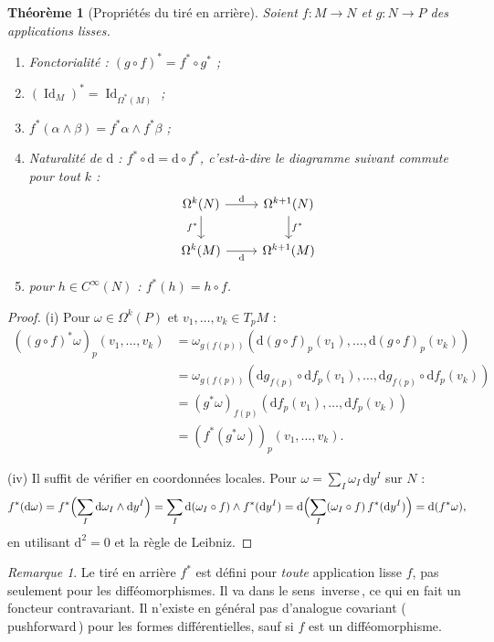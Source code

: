 \documentclass[12pt,a4paper,openany]{book}
\theoremstyle{definition}
\theoremstyle{plain}
\newtheorem{theoreme}[definition]{Théorème}
\theoremstyle{remark}
\newtheorem{remarque}[definition]{Remarque}
\DeclareMathOperator{\Id}{Id}
\newcommand{\dd}{\mathrm{d}}
\providecommand{\og}{\guillemotleft\,}
\providecommand{\fg}{\,\guillemotright}
\begin{document}
\begin{theoreme}[Propriétés du tiré en arrière]%
\label{thm:proprietes-pullback}
Soient $f \colon M \to N$ et $g \colon N \to P$ des applications lisses.
\begin{enumerate}[label=\textup{(\roman*)}]
  \item \emph{Fonctorialité :}
    $(g \circ f)^* = f^* \circ g^*$ ;
  \item $(\Id_M)^* = \Id_{\Omega^*(M)}$ ;
  \item $f^*(\alpha \wedge \beta) = f^*\alpha \wedge f^*\beta$ ;
  \item \emph{Naturalité de $\dd$ :}
    $f^* \circ \dd = \dd \circ f^*$, c'est-à-dire le diagramme
    suivant commute pour tout $k$ :
    \[
    \begin{tikzcd}
      \Omega^k(N) \arrow[r, "\dd"] \arrow[d, "f^*"'] &
        \Omega^{k+1}(N) \arrow[d, "f^*"] \\
      \Omega^k(M) \arrow[r, "\dd"'] & \Omega^{k+1}(M)
    \end{tikzcd}
    \]
  \item pour $h \in C^\infty(N)$ : $f^*(h) = h \circ f$.
\end{enumerate}
\end{theoreme}

\begin{proof}
(i) Pour $\omega \in \Omega^k(P)$ et $v_1, \ldots, v_k \in T_p M$ :
\begin{align*}
  ((g \circ f)^*\omega)_p(v_1, \ldots, v_k)
    &= \omega_{g(f(p))}(\dd(g \circ f)_p(v_1), \ldots,
      \dd(g \circ f)_p(v_k)) \\
    &= \omega_{g(f(p))}(\dd g_{f(p)} \circ \dd f_p(v_1), \ldots,
      \dd g_{f(p)} \circ \dd f_p(v_k)) \\
    &= (g^*\omega)_{f(p)}(\dd f_p(v_1), \ldots, \dd f_p(v_k)) \\
    &= (f^*(g^*\omega))_p(v_1, \ldots, v_k).
\end{align*}

(iv) Il suffit de vérifier en coordonnées locales. Pour
$\omega = \sum_I \omega_I\, \dd y^I$ sur $N$ :
\[
  f^*(\dd\omega) = f^*\Bigl(\sum_I \dd\omega_I \wedge \dd y^I\Bigr)
    = \sum_I \dd(\omega_I \circ f) \wedge f^*(\dd y^I)
    = \dd\Bigl(\sum_I (\omega_I \circ f)\, f^*(\dd y^I)\Bigr)
    = \dd(f^*\omega),
\]
en utilisant $\dd^2 = 0$ et la règle de Leibniz.
\end{proof}

\begin{remarque}\label{rem:pullback-pas-pushforward}
Le tiré en arrière $f^*$ est défini pour \emph{toute} application lisse
$f$, pas seulement pour les difféomorphismes. Il va dans le sens
\og{}inverse\fg{}, ce qui en fait un foncteur contravariant. Il n'existe
en général pas d'analogue covariant (\og{}pushforward\fg{}) pour les
formes différentielles, sauf si $f$ est un difféomorphisme.
\end{remarque}
\end{document}

